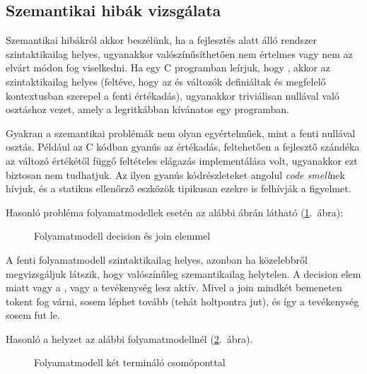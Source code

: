 \subsection{Szemantikai hibák vizsgálata}\label{sec:statikus-ellenorzes-szemantikai-hibak}

Szemantikai hibákról akkor beszélünk, ha a fejlesztés alatt álló rendszer szintaktikailag helyes, ugyanakkor valószínűsíthetően nem értelmes vagy nem az elvárt módon fog viselkedni. Ha egy C programban leírjuk, hogy , akkor az szintaktikailag helyes (feltéve, hogy az  és  változók definiáltak és megfelelő kontextusban szerepel a fenti értékadás), ugyanakkor triviálisan nullával való osztáshoz vezet, amely a legritkábban kívánatos egy programban.

Gyakran a szemantikai problémák nem olyan egyértelműek, mint a fenti nullával osztás. Például az  C kódban gyanús az értékadás, feltehetően a fejlesztő szándéka az  változó értékétől függő feltételes elágazás implementálása volt, ugyanakkor ezt biztosan nem tudhatjuk. Az ilyen gyanús kódrészleteket angolul \emph{code smell}nek hívjuk, és a statikus ellenőrző eszközök tipikusan ezekre is felhívják a figyelmet.

Hasonló probléma folyamatmodellek esetén az alábbi ábrán látható  (\ref{fig:folyamatmodell-decision-join}.~ábra):

\begin{figure}[h]
	\centering
	

	\caption{Folyamatmodell decision és join elemmel}
	\label{fig:folyamatmodell-decision-join}
\end{figure}

A fenti folyamatmodell szintaktikailag helyes, azonban ha közelebbről megvizsgáljuk látszik, hogy valószínűleg szemantikailag helytelen. A decision elem miatt vagy a , vagy a  tevékenység lesz aktív. Mivel a join mindkét bemeneten tokent fog várni, sosem léphet tovább (tehát holtpontra jut), és így a  tevékenység sosem fut le.

Hasonló a helyzet az alábbi folyamatmodellnél (\ref{fig:folyamatmodell-ket-terminalo}.~ábra).

\begin{figure}[h]
	\centering
	

	\caption{Folyamatmodell két termináló csomóponttal}
	\label{fig:folyamatmodell-ket-terminalo}
\end{figure}

